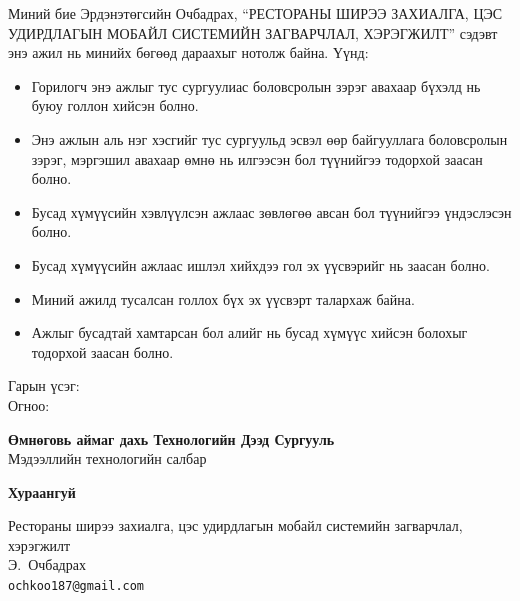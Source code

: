 \vspace{0.8cm}
{\normalsize
Миний бие Эрдэнэтөгсийн Очбадрах, ``РЕСТОРАНЫ ШИРЭЭ ЗАХИАЛГА, ЦЭС УДИРДЛАГЫН МОБАЙЛ
СИСТЕМИЙН ЗАГВАРЧЛАЛ, ХЭРЭГЖИЛТ'' сэдэвт энэ ажил нь минийх бөгөөд дараахыг нотолж байна.
Үүнд:

\begin{itemize}[leftmargin=2cm]
  \item Горилогч энэ ажлыг тус сургуулиас боловсролын зэрэг авахаар бүхэлд нь буюу
        голлон хийсэн болно.
  \item Энэ ажлын аль нэг хэсгийг тус сургуульд эсвэл өөр байгууллага боловсролын
        зэрэг, мэргэшил авахаар өмнө нь илгээсэн бол түүнийгээ тодорхой заасан болно.
  \item Бусад хүмүүсийн хэвлүүлсэн ажлаас зөвлөгөө авсан бол түүнийгээ үндэслэсэн болно.
  \item Бусад хүмүүсийн ажлаас ишлэл хийхдээ гол эх үүсвэрийг нь заасан болно.
  \item Миний ажилд тусалсан голлох бүх эх үүсвэрт талархаж байна.
  \item Ажлыг бусадтай хамтарсан бол алийг нь бусад хүмүүс хийсэн болохыг тодорхой
        заасан болно.
\end{itemize}

\vspace{2cm}
Гарын үсэг: \underline{\hspace{5cm}}\\[1cm]
Огноо: \underline{\hspace{5cm}}
}
\clearpage

\thispagestyle{plain}
\begin{center}
{\large\bfseries Өмнөговь аймаг дахь Технологийн Дээд Сургууль}\\
{\large Мэдээллийн технологийн салбар}

\vspace{0.3cm}
{\large\bfseries Хураангуй}

\vspace{0.2cm}
{\normalsize Рестораны ширээ захиалга, цэс удирдлагын мобайл системийн загварчлал, хэрэгжилт}\\[4pt]
{\normalsize Э.~Очбадрах}\\
{\small \texttt{ochkoo187@gmail.com}}
\end{center}

